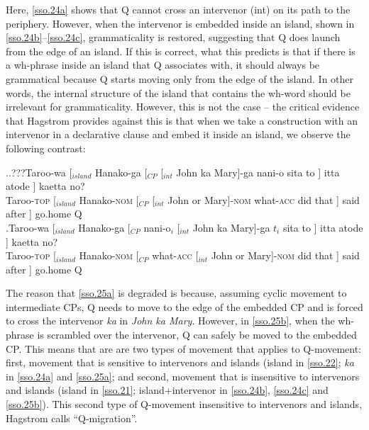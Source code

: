\documentclass{glossa}
\begin{document}
Here, \ref{sso.24a} shows that Q cannot cross an intervenor (int) on its path to the periphery. However, when the intervenor is embedded inside an island, shown in \ref{sso.24b}--\ref{sso.24c}, grammaticality is restored, suggesting that Q does launch from the edge of an island. If this is correct, what this predicts is that if there is a wh-phrase inside an island that Q associates with, it should always be grammatical because Q starts moving only from the edge of the island. In other words, the internal structure of the island that contains the wh-word should be irrelevant for grammaticality. However, this is not the case -- the critical evidence that Hagstrom provides against this is that when we take a construction with an intervenor in a declarative clause and embed it inside an island, we observe the following contrast:

\ex.\ag.???\label{sso.25a}Taroo-wa [$_{island}$ Hanako-ga [$_{CP}$ [$_{int}$ John ka Mary]-ga nani-o sita to ] itta atode ] kaetta no?\\
   Taroo-\textsc{top} [$_{island}$ Hanako-\textsc{nom} [$_{CP}$ [$_{int}$ John or Mary]-\textsc{nom} what-\textsc{acc} did that ] said after ] go.home Q\\
   \bg.\label{sso.25b}Taroo-wa [$_{island}$ Hanako-ga [$_{CP}$ nani-o$_i$ [$_{int}$ John ka Mary]-ga $t_i$ sita to ] itta atode ] kaetta no?\\
   Taroo-\textsc{top} [$_{island}$ Hanako-\textsc{nom} [$_{CP}$ what-\textsc{acc} [$_{int}$ John or Mary]-\textsc{nom} {} did that ] said after ] go.home Q\\

The reason that \ref{sso.25a} is degraded is because, assuming cyclic movement to intermediate CPs, Q needs to move to the edge of the embedded CP and is forced to cross the intervenor \textit{ka} in \textit{John ka Mary}. However, in \ref{sso.25b}, when the wh-phrase is scrambled over the intervenor, Q can safely be moved to the embedded CP. This means that are are two types of movement that applies to Q-movement: first, movement that is sensitive to intervenors and islands (island in \ref{sso.22}; \textit{ka} in \ref{sso.24a} and \ref{sso.25a}; and second, movement that is insensitive to intervenors and islands (island in \ref{sso.21}; island+intervenor in \ref{sso.24b}, \ref{sso.24c} and \ref{sso.25b}). This second type of Q-movement insensitive to intervenors and islands, Hagstrom calls ``Q-migration''.
\end{document}
